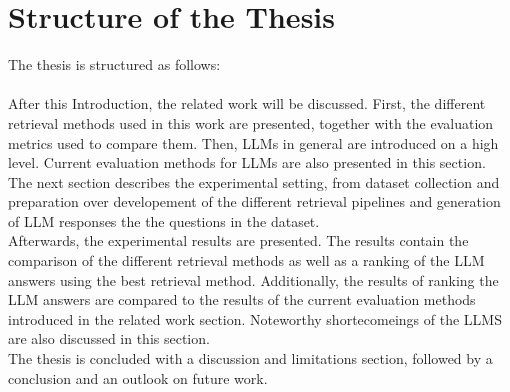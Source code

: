 \section{Structure of the Thesis}\label{sec:structure-of-the-thesis}
The thesis is structured as follows:\\\\
After this Introduction, the related work will be discussed.
First, the different retrieval methods used in this work are presented, together with the evaluation metrics used to compare them.
Then, LLMs in general are introduced on a high level. 
Current evaluation methods for LLMs are also presented in this section.
\\
The next section describes the experimental setting, from dataset collection and preparation over developement of the different retrieval pipelines and generation of LLM responses the the questions in the dataset.
\\
Afterwards, the experimental results are presented. The results contain the comparison of the different retrieval methods as well as a ranking of the LLM answers using the best retrieval method.
Additionally, the results of ranking the LLM answers are compared to the results of the current evaluation methods introduced in the related work section.
Noteworthy shortecomeings of the LLMS are also discussed in this section.
\\
The thesis is concluded with a discussion and limitations section, followed by a conclusion and an outlook on future work.